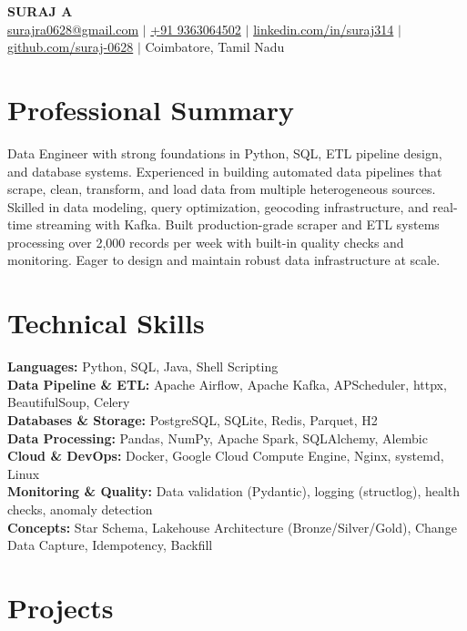 \documentclass[10pt]{article}
\begin{document}
\begin{center}
  {\LARGE\textbf{SURAJ A}}\\[4pt]
  \small
  \href{mailto:surajra0628@gmail.com}{surajra0628@gmail.com} $|$
  \href{tel:+919363064502}{+91 9363064502} $|$
  \href{https://linkedin.com/in/suraj314}{linkedin.com/in/suraj314} $|$
  \href{https://github.com/suraj-0628}{github.com/suraj-0628} $|$
  Coimbatore, Tamil Nadu
\end{center}

\section{Professional Summary}
Data Engineer with strong foundations in Python, SQL, ETL pipeline design, and database systems. Experienced in building automated data pipelines that scrape, clean, transform, and load data from multiple heterogeneous sources. Skilled in data modeling, query optimization, geocoding infrastructure, and real-time streaming with Kafka. Built production-grade scraper and ETL systems processing over 2,000 records per week with built-in quality checks and monitoring. Eager to design and maintain robust data infrastructure at scale.

\section{Technical Skills}
\textbf{Languages:} Python, SQL, Java, Shell Scripting \\
\textbf{Data Pipeline \& ETL:} Apache Airflow, Apache Kafka, APScheduler, httpx, BeautifulSoup, Celery \\
\textbf{Databases \& Storage:} PostgreSQL, SQLite, Redis, Parquet, H2 \\
\textbf{Data Processing:} Pandas, NumPy, Apache Spark, SQLAlchemy, Alembic \\
\textbf{Cloud \& DevOps:} Docker, Google Cloud Compute Engine, Nginx, systemd, Linux \\
\textbf{Monitoring \& Quality:} Data validation (Pydantic), logging (structlog), health checks, anomaly detection \\
\textbf{Concepts:} Star Schema, Lakehouse Architecture (Bronze/Silver/Gold), Change Data Capture, Idempotency, Backfill

\section{Projects}
\end{document}
